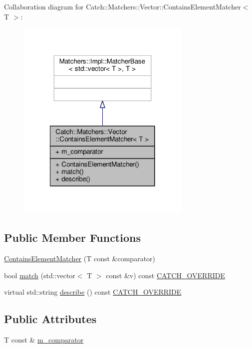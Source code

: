 Collaboration diagram for Catch\-:\-:Matchers\-:\-:Vector\-:\-:Contains\-Element\-Matcher$<$ T $>$\-:
\nopagebreak
\begin{figure}[H]
\begin{center}
\leavevmode
\includegraphics[width=236pt]{struct_catch_1_1_matchers_1_1_vector_1_1_contains_element_matcher__coll__graph}
\end{center}
\end{figure}
\subsection*{Public Member Functions}
\begin{DoxyCompactItemize}
\item 
\hyperlink{struct_catch_1_1_matchers_1_1_vector_1_1_contains_element_matcher_a6a05740b5d3f89fac8de84ac0cff7b93}{Contains\-Element\-Matcher} (T const \&comparator)
\item 
bool \hyperlink{struct_catch_1_1_matchers_1_1_vector_1_1_contains_element_matcher_a95fd99879bcfbe129898bef922c92c17}{match} (std\-::vector$<$ T $>$ const \&v) const \hyperlink{catch_8hpp_a8ecdce4d3f57835f707915ae831eb847}{C\-A\-T\-C\-H\-\_\-\-O\-V\-E\-R\-R\-I\-D\-E}
\item 
virtual std\-::string \hyperlink{struct_catch_1_1_matchers_1_1_vector_1_1_contains_element_matcher_a5a869772714dd045816707b74b217664}{describe} () const \hyperlink{catch_8hpp_a8ecdce4d3f57835f707915ae831eb847}{C\-A\-T\-C\-H\-\_\-\-O\-V\-E\-R\-R\-I\-D\-E}
\end{DoxyCompactItemize}
\subsection*{Public Attributes}
\begin{DoxyCompactItemize}
\item 
T const \& \hyperlink{struct_catch_1_1_matchers_1_1_vector_1_1_contains_element_matcher_ab7eada6c4bbce1d21b44773262f9cb23}{m\-\_\-comparator}
\end{DoxyCompactItemize}


